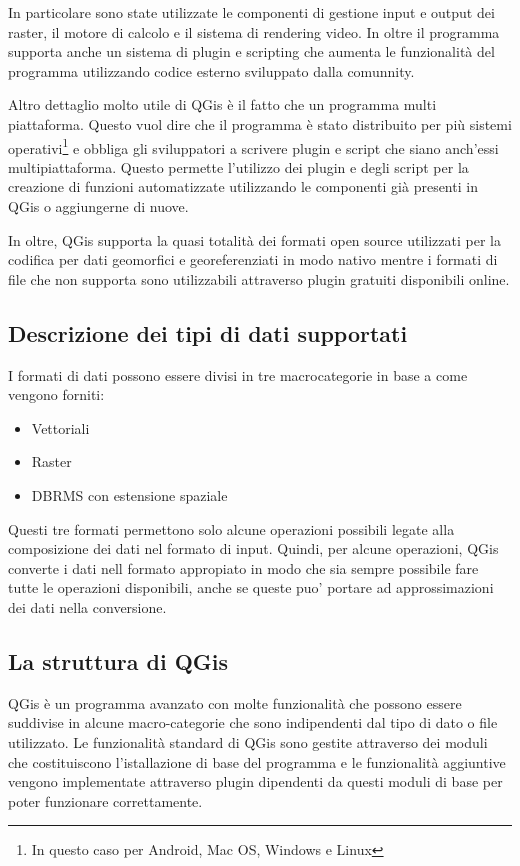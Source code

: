 In particolare sono state utilizzate le componenti di gestione input e output dei raster, il motore di calcolo e il sistema di rendering video. In oltre il programma supporta anche un sistema di plugin e scripting che aumenta le funzionalità del programma utilizzando codice esterno sviluppato dalla comunnity.

Altro dettaglio molto utile di QGis è il fatto che un programma multi piattaforma. Questo vuol dire che il programma è stato distribuito per più sistemi operativi\footnote{In questo caso per Android, Mac OS, Windows e Linux} e obbliga gli sviluppatori a scrivere plugin e script che siano anch'essi multipiattaforma. Questo permette l'utilizzo dei plugin e degli script per la creazione di funzioni automatizzate utilizzando le componenti già presenti in QGis o aggiungerne di nuove.

In oltre, QGis supporta la quasi totalità dei formati open source utilizzati per la codifica per dati geomorfici e georeferenziati in modo nativo mentre i formati di file che non supporta sono utilizzabili attraverso plugin gratuiti disponibili online.

\subsection{Descrizione dei tipi di dati supportati}

I formati di dati possono essere divisi in tre macrocategorie in base a come vengono forniti:
\begin{itemize}
	\item Vettoriali
	\item Raster
	\item DBRMS con estensione spaziale
\end{itemize}

Questi tre formati permettono solo alcune operazioni possibili legate alla composizione dei dati nel formato di input.
Quindi, per alcune operazioni, QGis converte i dati nell formato appropiato in modo che sia sempre possibile fare tutte le operazioni disponibili, anche se queste puo' portare ad approssimazioni dei dati nella conversione.

\subsection{La struttura di QGis}
QGis è un programma avanzato con molte funzionalità che possono essere suddivise in alcune macro-categorie che sono indipendenti dal tipo di dato o file utilizzato.
Le funzionalità standard di QGis sono gestite attraverso dei moduli che costituiscono l'istallazione di base del programma e le funzionalità aggiuntive vengono implementate attraverso plugin dipendenti da questi moduli di base per poter funzionare correttamente.

